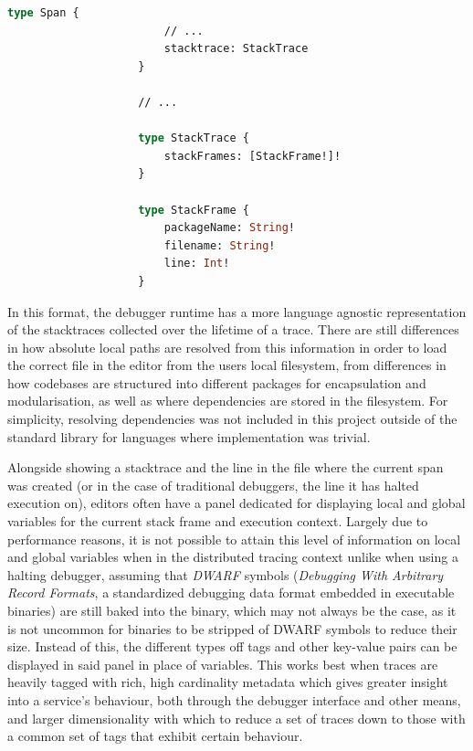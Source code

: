 \documentclass[12pt,pdftex,titlepage]{report}
\begin{document}
                \begin{lstlisting}[caption={GraphQL schema updated with stack- trace and frame objects, unchanged fields and objects filtered.}, language=GraphQL, gobble=20, label={lst:stack}]
                    type Span {
                        // ...
                        stacktrace: StackTrace
                    }

                    // ...

                    type StackTrace {
                        stackFrames: [StackFrame!]!
                    }

                    type StackFrame {
                        packageName: String!
                        filename: String!
                        line: Int!
                    }
                \end{lstlisting}

                In this format, the debugger runtime has a more language agnostic representation of the stacktraces collected over the lifetime of a trace. There are still differences
                in how absolute local paths are resolved from this information in order to load the correct file in the editor from the users local filesystem, from differences in how
                codebases are structured into different packages for encapsulation and modularisation, as well as where dependencies are stored in the filesystem. For simplicity, 
                resolving dependencies was not included in this project outside of the standard library for languages where implementation was trivial.

                Alongside showing a stacktrace and the line in the file where the current span was created (or in the case of traditional debuggers, the line it has halted execution on),
                editors often have a panel dedicated for displaying local and global variables for the current stack frame and execution context. Largely due to performance reasons, it is
                not possible to attain this level of information on local and global variables when in the distributed tracing context unlike when using a halting debugger, assuming that 
                \textit{DWARF} symbols (\textit{Debugging With Arbitrary Record Formats}, a standardized debugging data format embedded in executable binaries)\cite{dwarf} are still baked 
                into the binary, which may not always be the case, as it is not uncommon for binaries to be stripped of DWARF symbols to reduce their size. Instead of this, the different types off
                tags and other key-value pairs can be displayed in said panel in place of variables. This works best when traces are heavily tagged with rich, high cardinality metadata which gives 
                greater insight into a service's behaviour, both through the debugger interface and other means, and larger dimensionality with which to reduce a set of traces down to those with 
                a common set of tags that exhibit certain behaviour.
\end{document}
